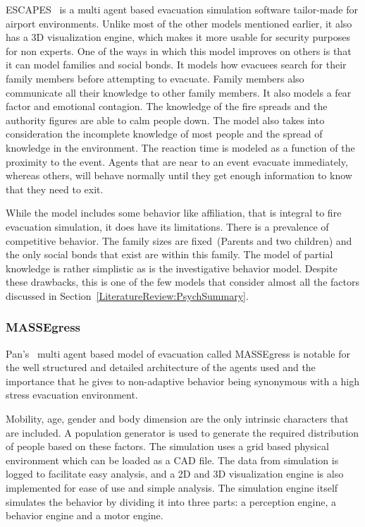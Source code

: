 ESCAPES~\cite{Tsai:2011tz} is a multi agent based evacuation simulation software tailor-made for airport environments. Unlike most of the other models mentioned earlier, it also has a 3D visualization engine, which makes it more usable for security purposes for non experts. One of the ways in which this model improves on others is that it can model families and social bonds. It models how evacuees search for their family members before attempting to evacuate. Family members also communicate all their knowledge to other family members. It also models a fear factor and emotional contagion. The knowledge of the fire spreads and the authority figures are able to calm people down. The model also takes into consideration the incomplete knowledge of most people and the spread of knowledge in the environment. The reaction time is modeled as a function of the proximity to the event. Agents that are near to an event evacuate immediately, whereas others, will behave normally until they get enough information to know that they need to exit.

While the model includes some behavior like affiliation, that is integral to fire evacuation simulation, it does have its limitations. There is a prevalence of competitive behavior. The family sizes are fixed~(Parents and two children) and the only social bonds that exist are within this family. The model of partial knowledge is rather simplistic as is the investigative behavior model. Despite these drawbacks, this is one of the few models that consider almost all the factors discussed in Section~\ref{LiteratureReview:PsychSummary}.

\subsubsection{MASSEgress}

Pan's~\cite{Pan:2006vp} multi agent based model of evacuation called MASSEgress is notable for the well structured and detailed architecture of the agents used and the importance that he gives to non-adaptive behavior being synonymous with a high stress evacuation environment.

Mobility, age, gender and body dimension are the only intrinsic characters that are included. A population generator is used to generate the required distribution of people based on these factors. The simulation uses a grid based physical environment which can be loaded as a CAD file. The data from simulation is logged to facilitate easy analysis, and a 2D and 3D visualization engine is also implemented for ease of use and simple analysis. The simulation engine itself simulates the behavior by dividing it into three parts: a perception engine, a behavior engine and a motor engine.

